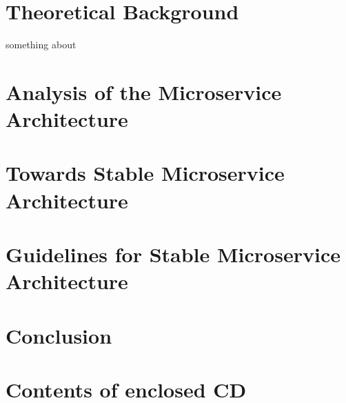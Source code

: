 \documentclass[thesis=M,english,hidelinks]{FITthesis}[2012/10/20]
\begin{document}
\chapter{Theoretical Background}
\label{sec:theoretical_background}
something about \cite{ns-towards-evolvable}


\chapter{Analysis of the Microservice Architecture}
\label{sec:msa_analysis}

\chapter{Towards Stable Microservice Architecture}
\label{sec:msa_compliance}

\chapter{Guidelines for Stable Microservice Architecture}
\label{sec:guidelines}

\chapter{Conclusion}
\label{sec:conclusion}





\appendix

\printglossary[type=\acronymtype,toctitle=]

\chapter{Contents of enclosed CD}
\begin{figure}
\end{figure}
\end{document}
